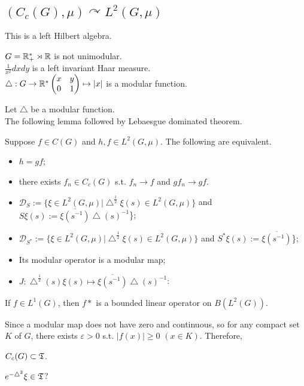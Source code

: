 \subsection{$(C_c(G),\mu) \curvearrowright L^2(G,\mu)$\label{nonunimodular}}
This is a left Hilbert algebra. 
\begin{example}
$G=\mathbb{R}_+^*\rtimes\mathbb{R}$ is not unimodular.\\

$\frac{1}{x^2}dxdy$ is a left invariant Haar measure.\\
$\bigtriangleup : G \rightarrow \mathbb{R}^*  \begin{pmatrix} x&y\\0&1 \end{pmatrix} \mapsto |x|$ is a modular function.\\
\end{example}
Let $\bigtriangleup$ be a modular function. \\
The following lemma followed by Lebaesgue dominated theorem.
\begin{lemma}
  Suppose $f \in C(G)$ and $h, f \in L^2(G,\mu)$. The following are equivalent.
  \begin{itemize}
    \item $h = gf$;
    \item there exists $f_n \in C_c(G)$ s.t. $f_n \rightarrow f$ and $gf_n \rightarrow gf$.
  \end{itemize}
\end{lemma}

\begin{theorem}
  \begin{itemize}
    \item $\mathcal{D}_S := \{\xi \in L^2(G,\mu) | \bigtriangleup^{\frac{1}{2}}\xi(s) \in L^2(G,\mu)\}$ and $S\xi(s) := \overline{\xi(s^{-1})}\bigtriangleup(s)^{-1}$\};
    \item $\mathcal{D}_{S^*} := \{\xi \in L^2(G,\mu) | \bigtriangleup^{\frac{1}{2}}\xi(s) \in L^2(G,\mu)\}$ and $S^*\xi(s) := \overline{\xi(s^{-1})}$\};
    \item Its modular operator is a modular map;
      \item $J : \bigtriangleup^{\frac{1}{2}}(s)\xi(s) \mapsto \overline{\xi(s^{-1})}\bigtriangleup(s)^{-1}$:
  \end{itemize}
\end{theorem}

\begin{lemma}
  If $f \in L^1(G)$, then $f*$ is a bounded linear operator on $B(L^2(G))$.
\end{lemma}

Since a modular map does not have zero and continuous, so for any compact set $K$ of $G$, there exists $\varepsilon > 0$ s.t. $|f(x)| \geq 0$ $ (x \in K)$. Therefore, 
\begin{theorem}
  $C_c(G) \subset \mathfrak{T}$.
\end{theorem}

$e^{-\bigtriangleup^2}\xi \in \mathfrak{T} $?
